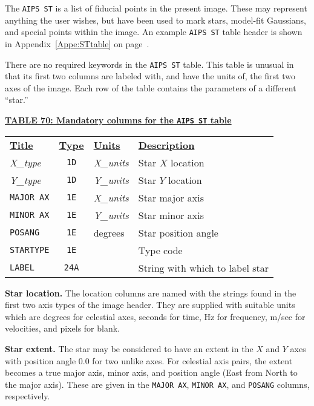 \documentclass[twoside]{article}
\begin{document}
The {\tt AIPS ST} is a list of fiducial points in the present image.
These may represent anything the user wishes, but have been used to
mark stars, model-fit Gaussians, and special points within the image.
An example {\tt AIPS ST} table header is shown in
Appendix~\ref{Appe:STtable} on page~\pageref{Appe:STtable}.

There are no required keywords in the {\tt AIPS ST} table.  This table
is unusual in that its first two columns are labeled with, and have
the units of, the first two axes of the image.  Each row of the table
contains the parameters of a different ``star.''

\begin{center}
\underline{\bf{TABLE 70: Mandatory columns for the {\tt AIPS ST} table}}\\
\begin{tabular}{lcll}
\noalign{\vspace{2pt}} \label{ta:STcols}
\underline{{\bf Title\vphantom{y}}} & \underline{\bf{Type}} &
   \underline{{\bf Units\vphantom{y}}} & \underline{\bf{Description}} \\
\noalign{\vspace{2pt}}
{\it X\_type}  & {\tt 1D} & {\it X\_units} & Star $X$ location \\
{\it Y\_type}  & {\tt 1D} & {\it Y\_units} & Star $Y$ location \\
{\tt MAJOR AX} & {\tt 1E} & {\it X\_units} & Star major axis \\
{\tt MINOR AX} & {\tt 1E} & {\it Y\_units} & Star minor axis \\
{\tt POSANG}   & {\tt 1E} & degrees & Star position angle \\
{\tt STARTYPE} & {\tt 1E} &         & Type code \\
{\tt LABEL}    & {\tt 24A} &        & String with which to label star
\end{tabular}
\end{center}

{\bf Star location.} The location columns are named with the strings
found in the first two axis types of the image header.  They are
supplied with suitable units which are degrees for celestial axes,
seconds for time, Hz for frequency, m/sec for velocities, and pixels
for blank.

{\bf Star extent.} The star may be considered to have an extent in the
$X$ and $Y$ axes with position angle 0.0 for two unlike axes.  For
celestial axis pairs, the extent becomes a true major axis, minor
axis, and position angle (East from North to the major axis).  These
are given in the {\tt MAJOR AX}, {\tt MINOR AX}, and {\tt POSANG}
columns, respectively.
\end{document}
